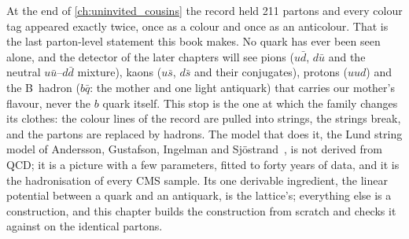 At the end of \cref{ch:uninvited_cousins} the record held 211 partons and
every colour tag appeared exactly twice, once as a colour and once as an
anticolour. That is the last parton-level statement this book makes. No
quark has ever been seen alone, and the detector of the later chapters will
see pions ($u\bar d$, $d\bar u$ and the neutral $u\bar u$--$d\bar d$ mixture),
kaons ($u\bar s$, $d\bar s$ and their conjugates), protons ($uud$) and the
B~hadron ($b\bar q$: the mother and one light antiquark) that carries our
mother's flavour, never the $b$ quark itself. This stop is the one at which the
family changes its clothes: the colour lines of the record are pulled into
strings, the strings break, and the partons are replaced by hadrons. The
model that does it, the Lund string model of Andersson, Gustafson, Ingelman
and Sj\"ostrand~\cite{Andersson:1983ia}, is not derived from QCD; it is a
picture with a few parameters, fitted to forty years of data, and it is the
hadronisation of every CMS sample. Its one derivable ingredient, the linear
potential between a quark and an antiquark, is the lattice's; everything
else is a construction, and this chapter builds the construction from
scratch and checks it against \PYTHIA on the identical partons.

